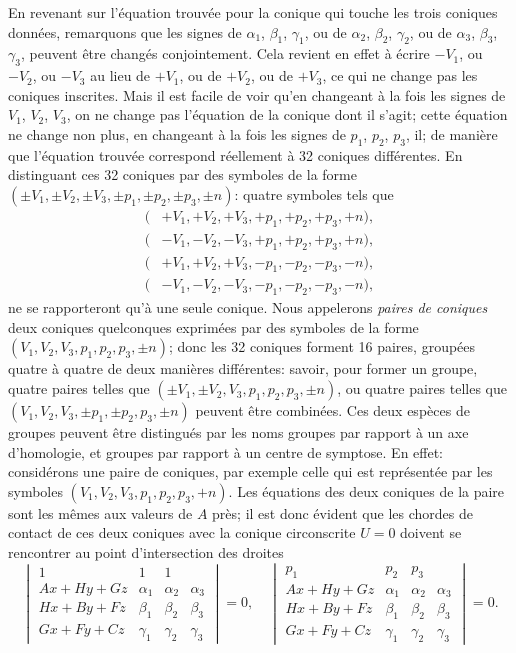 \documentclass[11pt,a4paper]{book}
\begin{document}
En revenant sur l'\'{e}quation trouv\'{e}e pour la conique qui touche les trois coniques donn\'{e}es, remarquons que les signes de $\alpha_1$, $\beta_1$, $\gamma_1$, ou de $\alpha_2$, $\beta_2$, $\gamma_2$, ou de $\alpha_3$, $\beta_3$, $\gamma_3$, peuvent \^{e}tre chang\'{e}s conjointement. Cela revient en effet \`{a} \'{e}crire $-V_1$, ou $-V_2$, ou $-V_3$ au lieu de $+V_1$, ou de $+V_2$, ou de $+V_3$, ce qui ne change pas les coniques inscrites. Mais il est facile de voir qu'en changeant \`{a} la fois les signes de $V_1$, $V_2$, $V_3$, on ne change pas l'\'{e}quation de la conique dont il s'agit; cette \'{e}quation ne change non plus, en changeant \`{a} la fois les signes de $p_1$, $p_2$, $p_3$, il; de mani\`{e}re que l'\'{e}quation trouv\'{e}e correspond r\'{e}ellement \`{a} 32 coniques diff\'{e}rentes. En distinguant ces 32 coniques par des symboles de la forme $(\pm V_1, \pm V_2, \pm V_3, \pm p_1, \pm p_2, \pm p_3, \pm n)$: quatre symboles tels que
\begin{align*}
(&+V_1, +V_2, +V_3, +p_1, +p_2, +p_3, +n), \\
(&-V_1, -V_2, -V_3, +p_1, +p_2, +p_3, +n), \\
(&+V_1, +V_2, +V_3, -p_1, -p_2, -p_3, -n), \\
(&-V_1, -V_2, -V_3, -p_1, -p_2, -p_3, -n),
\end{align*}
ne se rapporteront qu'\`{a} une seule conique. Nous appelerons \emph{paires de coniques} deux coniques quelconques exprim\'{e}es par des symboles de la forme $(V_1, V_2, V_3, p_1, p_2, p_3, \pm n)$; donc les 32 coniques forment 16 paires, group\'{e}es quatre \`{a} quatre de deux mani\`{e}res diff\'{e}rentes: savoir, pour former un groupe, quatre paires telles que $(\pm V_1, \pm V_2, V_3, p_1, p_2, p_3, \pm n)$, ou quatre paires telles que $(V_1, V_2, V_3, \pm p_1, \pm p_2, p_3, \pm n)$ peuvent \^{e}tre combin\'{e}es. Ces deux esp\`{e}ces de groupes peuvent \^{e}tre distingu\'{e}s par les noms groupes par rapport \`{a} un axe d'homologie, et groupes par rapport \`{a} un centre de symptose.
En effet: consid\'{e}rons une paire de coniques, par exemple celle qui est repr\'{e}sent\'{e}e par les symboles $(V_1, V_2, V_3, p_1, p_2, p_3, +n)$. Les \'{e}quations des deux coniques de la paire sont les m\^{e}mes aux valeurs de $A$ pr\`{e}s; il est donc \'{e}vident que les chordes de contact de ces deux coniques avec la conique circonscrite $U = 0$ doivent se rencontrer au point d'intersection des droites
\[
\begin{vmatrix} 1 & 1 & 1 \\ Ax + Hy + Gz & \alpha_1 & \alpha_2 & \alpha_3 \\ Hx + By + Fz & \beta_1 & \beta_2 & \beta_3 \\ Gx + Fy + Cz & \gamma_1 & \gamma_2 & \gamma_3 \end{vmatrix} = 0, \quad
\begin{vmatrix} p_1 & p_2 & p_3 \\ Ax + Hy + Gz & \alpha_1 & \alpha_2 & \alpha_3 \\ Hx + By + Fz & \beta_1 & \beta_2 & \beta_3 \\ Gx + Fy + Cz & \gamma_1 & \gamma_2 & \gamma_3 \end{vmatrix} = 0.
\]
\end{document}
